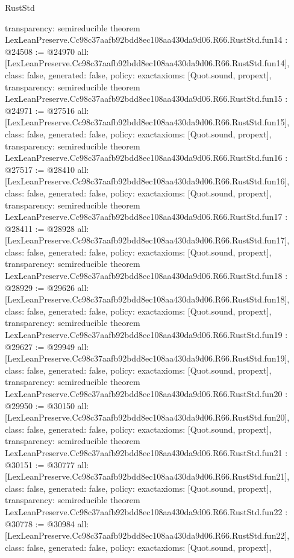 \begin{lexlean}{RustStd}
\begin{coremodule}
{  transparency: semireducible
}
theorem LexLeanPreserve.Cc98c37aafb92bdd8ec108aa430da9d06.R66.RustStd.fun14 : @24508 := @24970 {
  all: [LexLeanPreserve.Cc98c37aafb92bdd8ec108aa430da9d06.R66.RustStd.fun14],
  class: false,
  generated: false,
  policy: exact{axioms: [Quot.sound, propext]},
  transparency: semireducible
}
theorem LexLeanPreserve.Cc98c37aafb92bdd8ec108aa430da9d06.R66.RustStd.fun15 : @24971 := @27516 {
  all: [LexLeanPreserve.Cc98c37aafb92bdd8ec108aa430da9d06.R66.RustStd.fun15],
  class: false,
  generated: false,
  policy: exact{axioms: [Quot.sound, propext]},
  transparency: semireducible
}
theorem LexLeanPreserve.Cc98c37aafb92bdd8ec108aa430da9d06.R66.RustStd.fun16 : @27517 := @28410 {
  all: [LexLeanPreserve.Cc98c37aafb92bdd8ec108aa430da9d06.R66.RustStd.fun16],
  class: false,
  generated: false,
  policy: exact{axioms: [Quot.sound, propext]},
  transparency: semireducible
}
theorem LexLeanPreserve.Cc98c37aafb92bdd8ec108aa430da9d06.R66.RustStd.fun17 : @28411 := @28928 {
  all: [LexLeanPreserve.Cc98c37aafb92bdd8ec108aa430da9d06.R66.RustStd.fun17],
  class: false,
  generated: false,
  policy: exact{axioms: [Quot.sound, propext]},
  transparency: semireducible
}
theorem LexLeanPreserve.Cc98c37aafb92bdd8ec108aa430da9d06.R66.RustStd.fun18 : @28929 := @29626 {
  all: [LexLeanPreserve.Cc98c37aafb92bdd8ec108aa430da9d06.R66.RustStd.fun18],
  class: false,
  generated: false,
  policy: exact{axioms: [Quot.sound, propext]},
  transparency: semireducible
}
theorem LexLeanPreserve.Cc98c37aafb92bdd8ec108aa430da9d06.R66.RustStd.fun19 : @29627 := @29949 {
  all: [LexLeanPreserve.Cc98c37aafb92bdd8ec108aa430da9d06.R66.RustStd.fun19],
  class: false,
  generated: false,
  policy: exact{axioms: [Quot.sound, propext]},
  transparency: semireducible
}
theorem LexLeanPreserve.Cc98c37aafb92bdd8ec108aa430da9d06.R66.RustStd.fun20 : @29950 := @30150 {
  all: [LexLeanPreserve.Cc98c37aafb92bdd8ec108aa430da9d06.R66.RustStd.fun20],
  class: false,
  generated: false,
  policy: exact{axioms: [Quot.sound, propext]},
  transparency: semireducible
}
theorem LexLeanPreserve.Cc98c37aafb92bdd8ec108aa430da9d06.R66.RustStd.fun21 : @30151 := @30777 {
  all: [LexLeanPreserve.Cc98c37aafb92bdd8ec108aa430da9d06.R66.RustStd.fun21],
  class: false,
  generated: false,
  policy: exact{axioms: [Quot.sound, propext]},
  transparency: semireducible
}
theorem LexLeanPreserve.Cc98c37aafb92bdd8ec108aa430da9d06.R66.RustStd.fun22 : @30778 := @30984 {
  all: [LexLeanPreserve.Cc98c37aafb92bdd8ec108aa430da9d06.R66.RustStd.fun22],
  class: false,
  generated: false,
  policy: exact{axioms: [Quot.sound, propext]},
}
\end{coremodule}
\end{lexlean}
